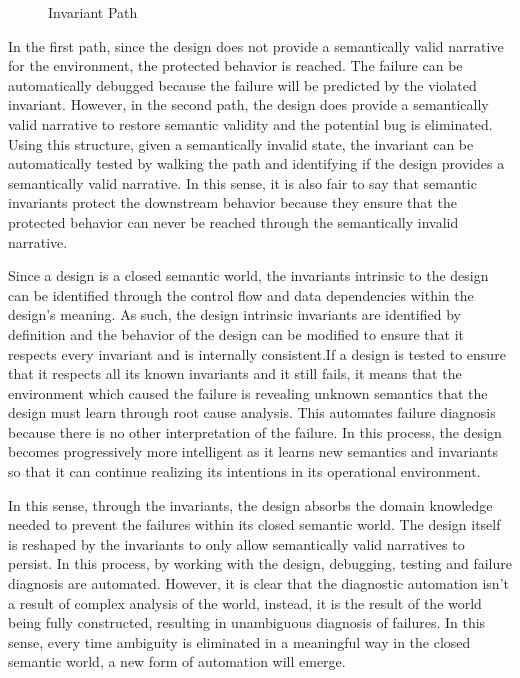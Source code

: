 \begin{figure}[htbp]
    
    \caption{Invariant Path}
    \label{fig:invariant_path}
\end{figure}

In the first path, since the design does not provide a semantically valid narrative for the environment, the protected behavior is reached. The failure can be automatically debugged because the failure will be predicted by the violated invariant. However, in the second path, the design does provide a semantically valid narrative to restore semantic validity and the potential bug is eliminated. Using this structure, given a semantically invalid state, the invariant can be automatically tested by walking the path and identifying if the design provides a semantically valid narrative. In this sense, it is also fair to say that semantic invariants protect the downstream behavior because they ensure that the protected behavior can never be reached through the semantically invalid narrative.

Since a design is a closed semantic world, the invariants intrinsic to the design can be identified through the control flow and data dependencies within the design's meaning. As such, the design intrinsic invariants are identified by definition and the behavior of the design can be modified to ensure that it respects every invariant and is internally consistent.If a design is tested to ensure that it respects all its known invariants and it still fails, it means that the environment which caused the failure is revealing unknown semantics that the design must learn through root cause analysis. This automates failure diagnosis because there is no other interpretation of the failure. In this process, the design becomes progressively more intelligent as it learns new semantics and invariants so that it can continue realizing its intentions in its operational environment.

In this sense, through the invariants, the design absorbs the domain knowledge needed to prevent the failures within its closed semantic world. The design itself is reshaped by the invariants to only allow semantically valid narratives to persist. In this process, by working with the design, debugging, testing and failure diagnosis are automated. However, it is clear that the diagnostic automation isn’t a result of complex analysis of the world, instead, it is the result of the world being fully constructed, resulting in unambiguous diagnosis of failures. In this sense, every time ambiguity is eliminated in a meaningful way in the closed semantic world, a new form of automation will emerge.
